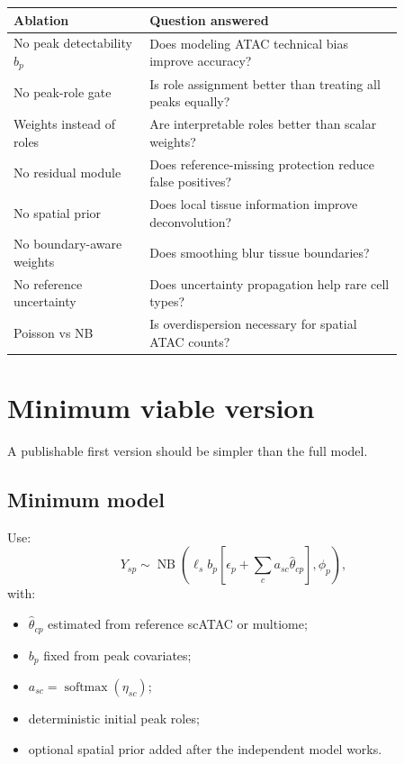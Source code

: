 \documentclass[11pt]{article}
\newcommand{\NB}{\operatorname{NB}}
\newcommand{\softmax}{\operatorname{softmax}}
\begin{document}
\begin{center}
\begin{tabular}{p{0.30\linewidth}p{0.56\linewidth}}
\toprule
Ablation & Question answered \\
\midrule
No peak detectability $b_p$ & Does modeling ATAC technical bias improve accuracy? \\
No peak-role gate & Is role assignment better than treating all peaks equally? \\
Weights instead of roles & Are interpretable roles better than scalar weights? \\
No residual module & Does reference-missing protection reduce false positives? \\
No spatial prior & Does local tissue information improve deconvolution? \\
No boundary-aware weights & Does smoothing blur tissue boundaries? \\
No reference uncertainty & Does uncertainty propagation help rare cell types? \\
Poisson vs NB & Is overdispersion necessary for spatial ATAC counts? \\
\bottomrule
\end{tabular}
\end{center}

\section{Minimum viable version}

A publishable first version should be simpler than the full model.

\subsection{Minimum model}

Use:
\[
Y_{sp}\sim\NB\left(\ell_s b_p\left[\epsilon_p+\sum_c a_{sc}\hat{\theta}_{cp}\right],\phi_p\right),
\]
with:
\begin{itemize}
    \item $\hat{\theta}_{cp}$ estimated from reference scATAC or multiome;
    \item $b_p$ fixed from peak covariates;
    \item $a_{sc}=\softmax(\eta_{sc})$;
    \item deterministic initial peak roles;
    \item optional spatial prior added after the independent model works.
\end{itemize}
\end{document}
